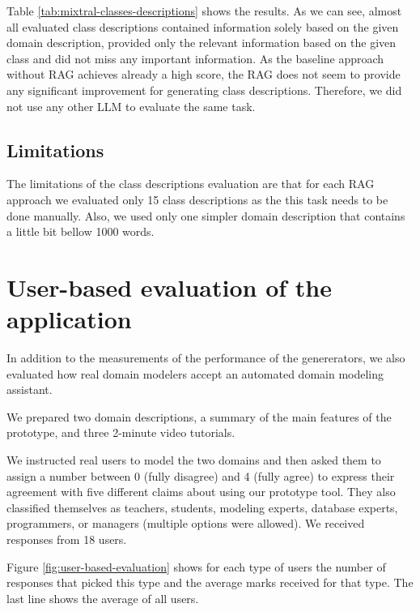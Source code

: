 Table \ref{tab:mixtral-classes-descriptions} shows the results. As we can see, almost all evaluated class descriptions contained information solely based on the given domain description, provided only the relevant information based on the given class and did not miss any important information. As the baseline approach without RAG achieves already a high score, the RAG does not seem to provide any significant improvement for generating class descriptions. Therefore, we did not use any other LLM to evaluate the same task.


\subsection{Limitations}

The limitations of the class descriptions evaluation are that for each RAG approach we evaluated only 15 class descriptions as the this task needs to be done manually. Also, we used only one simpler domain description that contains a little bit bellow 1000 words.


\section{User-based evaluation of the application}

In addition to the measurements of the performance of the genererators, we also evaluated how real domain modelers accept an automated domain modeling assistant.

We prepared two domain descriptions, a summary of the main features of the prototype, and three 2-minute video tutorials.

We instructed real users to model the two domains and then asked them to assign a number between 0 (fully disagree) and 4 (fully agree) to express their agreement with five different claims about using our prototype tool.
They also classified themselves as teachers, students, modeling experts, database experts, programmers, or managers (multiple options were allowed).
We received responses from 18 users.

Figure \ref{fig:user-based-evaluation} shows for each type of users the number of responses that picked this type and the average marks received for that type. The last line shows the average of all users.

